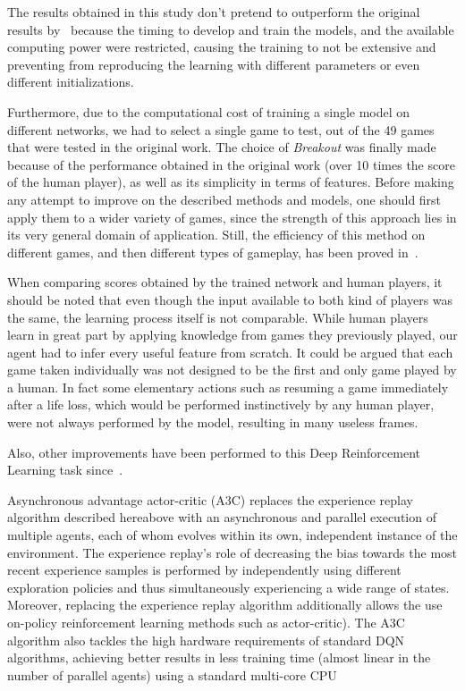 \documentclass[letterpaper]{article}
\begin{document}
The results obtained in this study don't pretend to outperform the original results by~\cite{mnih2015human} because the timing to develop and train the models,
and the available computing power were restricted, causing the training to not be extensive and preventing from reproducing the learning with different
parameters or even different initializations.

Furthermore, due to the computational cost of training a single model on different networks, we had to select a single game to test, out of the 49 games that were tested
in the original work. The choice of \textit{Breakout} was finally made because of the performance obtained in the original work (over 10 times the score of the
human player), as well as its simplicity in terms of features. Before making any attempt to improve on the described methods and models, one should first apply
them to a wider variety of games, since the strength of this approach lies in its very general domain of application. Still, the efficiency of this method on
different games, and then different types of gameplay, has been proved in~\cite{mnih2015human}.

When comparing scores obtained by the trained network and human players, it should be noted that even though the input available to both kind of players was the same,
the learning process itself is not comparable. While human players learn in great part by applying knowledge from games they previously played, our agent had to
infer every useful feature from scratch. It could be argued that each game taken individually was not designed to be the first and only game played by a human. In fact
some elementary actions such as resuming a game immediately after a life loss, which would be performed instinctively by any human player, were not always performed by
the model, resulting in many useless frames.

Also, other improvements have been performed to this Deep Reinforcement Learning task since~\citep{mnih2015human}.

Asynchronous advantage actor-critic (A3C) replaces the experience replay algorithm described hereabove with an asynchronous and parallel execution of multiple agents,
each of whom evolves within its own, independent instance of the environment. The experience replay's role of decreasing the bias towards the most recent experience samples
is performed by independently using different exploration policies and thus simultaneously experiencing a wide range of states. Moreover, replacing the experience replay
algorithm additionally allows the use on-policy reinforcement learning methods such as actor-critic). The A3C algorithm also tackles the high hardware requirements of
standard DQN algorithms, achieving better results in less training time (almost linear in the number of parallel agents) using a standard multi-core CPU~\citep{mnih2016asynchronous}
\end{document}

